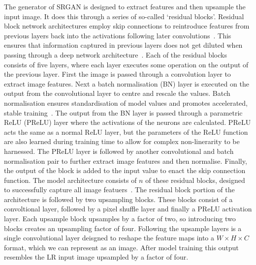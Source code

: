 The generator of SRGAN is designed to extract features and then upsample the input image. It does this through a series of so-called `residual blocks'. Residual block network architectures employ skip connections to reintroduce features from previous layers back into the activations following later convolutions~\cite{ref}. This ensures that information captured in previous layers does not get diluted when passing through a deep network architecture~\cite{ref}. Each of the residual blocks consists of five layers, where each layer executes some operation on the output of the previous layer. First the image is passed through a convolution layer to extract image features. Next a batch normalisation (BN) layer is executed on the output from the convolutional layer to centre and rescale the values. Batch normalisation ensures standardisation of model values and promotes accelerated, stable training~\cite{ref}. The output from the BN layer is passed through a parametric ReLU (PReLU) layer where the activations of the neurons are calculated. PReLU acts the same as a normal ReLU layer, but the parameters of the ReLU function are also learned during training time to allow for complex non-linerarity to be harnessed. The PReLU layer is followed by another convolutional and batch normalisation pair to further extract image features and then normalise. Finally, the output of the block is added to the input value to enact the skip connection function. The model architecture consists of $n$ of these residual blocks, designed to successfully capture all image featuers~\cite{ref}. The residual block portion of the architecture is followed by two upsampling blocks. These blocks consist of a convoltional layer, followed by a pixel shuffle layer and finally a PReLU activation layer. Each upsample block upsamples by a factor of two, so introducing two blocks creates an upsampling factor of four. Following the upsample layers is a single convolutional layer deisgned to reshape the feature maps into a $W \times H \times C$ format, which we can represent as an image. After model training this output resembles the LR input image upsampled by a factor of four.

